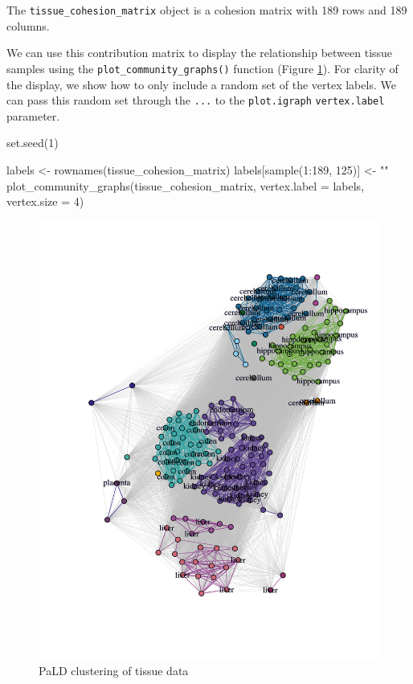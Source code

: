The \texttt{tissue\_cohesion\_matrix} object is a cohesion matrix with
189 rows and 189 columns.

We can use this contribution matrix to display the relationship between
tissue samples using the \texttt{plot\_community\_graphs()} function
(Figure \ref{fig:fig5}). For clarity of the display, we show how to only
include a random set of the vertex labels. We can pass this random set
through the \texttt{...} to the \texttt{plot.igraph}
\texttt{vertex.label} parameter.

\begin{Schunk}
\begin{Sinput}
set.seed(1)

labels <- rownames(tissue_cohesion_matrix)
labels[sample(1:189, 125)] <- ""
plot_community_graphs(tissue_cohesion_matrix,
                      vertex.label = labels,
                      vertex.size = 4)
\end{Sinput}
\begin{figure}
\includegraphics{manuscript_files/figure-latex/fig5-1} \caption[PaLD clustering of tissue data]{PaLD clustering of tissue data}\label{fig:fig5}
\end{figure}
\end{Schunk}

